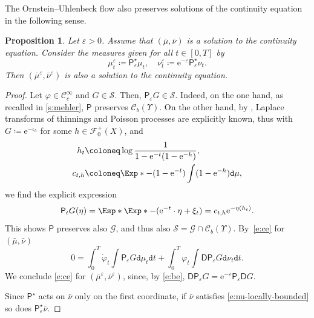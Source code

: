 \documentclass[JEP,XML,SOM,Unicode,published]{cedram}
\newtheorem{proposition}[theorem]{Proposition}
\theoremstyle{definition}
\theoremstyle{remark}
\begin{document}
The Ornstein--Uhlenbeck flow also preserves solutions of the continuity equation in the following sense.
\begin{proposition}\label{t:stability-ou-solution}
Let $\varepsilon > 0$.
Assume that $(\bar{\mu}, \bar{\nu})$ is a solution to the continuity equation.
Consider the measures given for all $t \in [0,T]$ by
\begin{equation*}
\mu^{\varepsilon}_{t} \coloneq \mathsf{P}_{\varepsilon}^{\star} \mu_{t}, \quad \nu^{\varepsilon}_{t} \coloneq \mathrm{e}^{-\varepsilon} \mathsf{P}_{\varepsilon}^{\star} \nu_{t}.
\end{equation*}
Then $(\bar{\mu}^{\varepsilon}, \bar{\nu}^{\varepsilon})$ is also a solution to the continuity equation.
\end{proposition}

\begin{proof}
Let $\varphi \in \mathscr{C}_{c}^{\infty}$ and $G \in \mathscr{S}$.
Then, $\mathsf{P}_{\varepsilon} G \in \mathscr{S}$.
Indeed, on the one hand, as recalled in \cref{s:mehler}, $\mathsf{P}$ preserves $\mathscr{C}_{b}(\varUpsilon)$.
On the other hand, by \cite[Lem.\,3.1]{Kallenberg}, Laplace transforms of thinnings and Poisson processes are explicitly known, thus with $G \coloneq \mathrm{e}^{-\iota_{h}}$ for some $h \in \mathscr{F}_{0}^{+}(X)$, and
\begin{align*}
h_{t} \coloneq& \log \frac{1}{1 - \mathrm{e}^{-t}(1-\mathrm{e}^{-h})},
\\
c_{t,h} \coloneq& \Exp*{- (1-\mathrm{e}^{-t}) \int (1-\mathrm{e}^{-h}) \mathtt{d} \mu},
\end{align*}
we find the explicit expression
\begin{equation*}
\mathsf{P}_{t}G(\eta) = \Esp*{ \Exp*{ - (\mathrm{e}^{-t} \cdot \eta + \xi_{t})}} = c_{t,h} \mathrm{e}^{-\eta(h_{t})}.
\end{equation*}
This shows $\mathsf{P}$ preserves also $\mathscr{G}$, and thus also $\mathscr{S} = \mathscr{G} \cap \mathscr{C}_{b}(\varUpsilon)$.
By~\cref{e:ce} for $(\bar{\mu}, \bar{\nu})$
\begin{equation*}
0 = \int_{0}^{T} \dot{\varphi}_{t} \int \mathsf{P}_{\varepsilon} G \mathtt{d} \mu_{t} \mathtt{d} t + \int_{0}^{T} \varphi_{t} \int \mathsf{D} \mathsf{P}_{\varepsilon} G \mathtt{d} \nu_{t} \mathtt{d} t.
\end{equation*}
We conclude \cref{e:ce} for $(\bar{\mu}^{\varepsilon}, \bar{\nu}^{\varepsilon})$, since, by \cref{e:be}, $\mathsf{D} \mathsf{P}_{\varepsilon} G = \mathrm{e}^{-\varepsilon} \mathsf{P}_{\varepsilon} \mathsf{D} G$.

Since $\mathsf{P}^{\star}$ acts on $\bar{\nu}$ only on the first coordinate, if $\bar{\nu}$ satisfies \cref{e:nu-locally-bounded} so does $\mathsf{P}^{\star}_{\varepsilon} \bar{\nu}$.
\end{proof}
\end{document}
